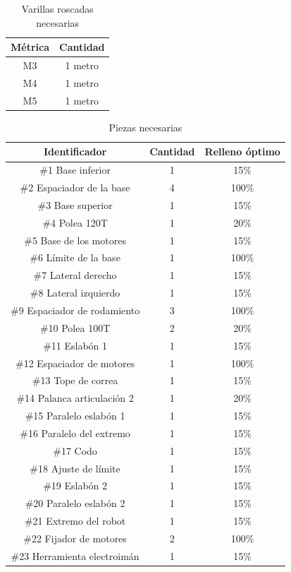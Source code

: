   \begin{table}[H]
    \begin{center}
    \begin{tabular}{|c|c|}
    \hline
    \textbf{Métrica} & \textbf{Cantidad} \\
    \hline
    M3 & 1 metro\\
    M4 & 1 metro\\
    M5 & 1 metro\\
  
    \hline
    \end{tabular}
    \caption{Varillas roscadas necesarias}
    \label{cuadro:varillas}
    \end{center}
    \end{table}


\begin{table}[H]
  \begin{center}
  \begin{tabular}{|c|c|c|}
  \hline
  \textbf{Identificador} & \textbf{Cantidad} & \textbf{Relleno óptimo} \\
  \hline
  \#1 Base inferior & 1 & 15\% \\
  \hline
  \#2 Espaciador de la base & 4 & 100\% \\
  \hline
  \#3 Base superior & 1 & 15\% \\
  \hline
  \#4 Polea 120T & 1 & 20\% \\
  \hline
  \#5 Base de los motores & 1 & 15\% \\
  \hline
  \#6 Límite de la base & 1 & 100\% \\
  \hline
  \#7 Lateral derecho & 1 & 15\% \\
  \hline
  \#8 Lateral izquierdo & 1 & 15\% \\
  \hline
  \#9 Espaciador de rodamiento & 3 & 100\% \\
  \hline
  \#10 Polea 100T & 2 & 20\% \\
  \hline
  \#11 Eslabón 1 & 1 & 15\% \\
  \hline
  \#12 Espaciador de motores & 1 & 100\% \\
  \hline
  \#13 Tope de correa & 1 & 15\% \\
  \hline
  \#14 Palanca articulación 2 & 1 & 20\% \\
  \hline
  \#15 Paralelo eslabón 1 & 1 & 15\% \\
  \hline
  \#16 Paralelo del extremo & 1 & 15\% \\
  \hline
  \#17 Codo & 1 & 15\% \\
  \hline
  \#18 Ajuste de límite & 1 & 15\% \\
  \hline
  \#19 Eslabón 2 & 1 & 15\% \\
  \hline
  \#20 Paralelo eslabón 2 & 1 & 15\% \\
  \hline
  \#21 Extremo del robot & 1 & 15\% \\
  \hline
  \#22 Fijador de motores & 2 & 100\% \\
  \hline
  \#23 Herramienta electroimán & 1 & 15\% \\
  \hline
  \end{tabular}
  \caption{Piezas necesarias}
  \label{cuadro:piezas}
  \end{center}
  \end{table}
  

